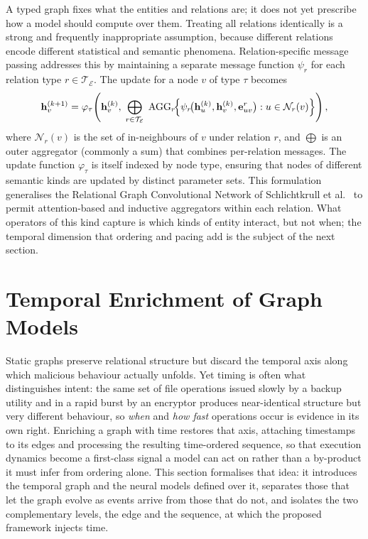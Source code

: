 \documentclass[%
    BCOR=10mm,
    DIV=13,
    toc=bibliography,
    toc=listof,
    oneside,
    12pt,
]{scrbook}
\begin{document}
A typed graph fixes what the entities and relations are; it does not yet
prescribe how a model should compute over them. Treating all relations
identically is a strong and frequently inappropriate assumption, because
different relations encode different statistical and semantic phenomena.
Relation-specific message passing addresses this by maintaining a separate
message function $\psi_r$ for each relation type $r \in
\mathcal{T}_\mathcal{E}$. The update for a node $v$ of type $\tau$ becomes
\begin{equation} \mathbf{h}_v^{(k+1)} = \varphi_\tau\!\left(
\mathbf{h}_v^{(k)},\; \bigoplus_{r \in \mathcal{T}_\mathcal{E}}\;
\mathrm{AGG}_r\!\Bigl\{ \psi_r\!\bigl(\mathbf{h}_u^{(k)}, \mathbf{h}_v^{(k)},
\mathbf{e}_{uv}^{r}\bigr) : u \in \mathcal{N}_r(v) \Bigr\} \right),
\label{eq:hetero_agg} \end{equation} where $\mathcal{N}_r(v)$ is the set of
in-neighbours of $v$ under relation $r$, and $\bigoplus$ is an outer
aggregator (commonly a sum) that combines per-relation messages. The update
function $\varphi_\tau$ is itself indexed by node type, ensuring that nodes of
different semantic kinds are updated by distinct parameter sets. This
formulation generalises the Relational Graph Convolutional Network of
Schlichtkrull et al.~\cite{schlichtkrull2018} to permit attention-based and
inductive aggregators within each relation. What operators of this kind
capture is which kinds of entity interact, but not when; the temporal
dimension that ordering and pacing add is the subject of the next section.

\section{Temporal Enrichment of Graph Models}
\label{sec:temporal_graph}

Static graphs preserve relational structure but discard the temporal axis along
which malicious behaviour actually unfolds. Yet timing is often what
distinguishes intent: the same set of file operations issued slowly by a backup
utility and in a rapid burst by an encryptor produces near-identical structure
but very different behaviour, so \emph{when} and \emph{how fast} operations occur
is evidence in its own right. Enriching a graph with time restores that axis,
attaching timestamps to its edges and processing the resulting
time-ordered sequence, so that execution dynamics become a first-class signal a
model can act on rather than a by-product it must infer from ordering alone. This
section formalises that idea: it introduces the temporal graph and the neural
models defined over it, separates those that let the graph evolve as events
arrive from those that do not, and isolates the two complementary levels, the
edge and the sequence, at which the proposed framework injects time.
\end{document}
